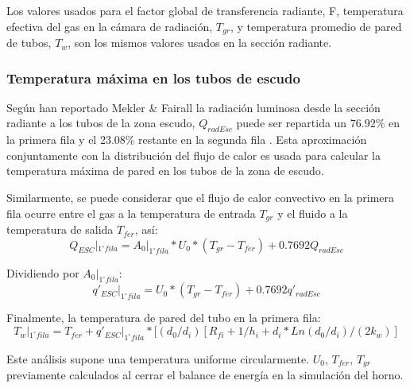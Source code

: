 \par Los valores usados para el factor global de transferencia radiante, F, temperatura efectiva del gas en la cámara de radiación, $T_{gr}$, y temperatura promedio de pared de tubos, $T_w$, son los mismos valores usados en la sección radiante.

\subsubsection{Temperatura máxima en los tubos de escudo}
\par Según han reportado Mekler \& Fairall la radiación luminosa desde la sección radiante a los tubos de la zona escudo, $Q_{radEsc}$ puede ser repartida un 76.92\% en la primera fila y el 23.08\% restante en la segunda fila \cite{bib:mekler}. Esta aproximación conjuntamente con la distribución del flujo de calor es usada para calcular la temperatura máxima de pared en los tubos de la zona de escudo.
\par Similarmente, se puede considerar que el flujo de calor convectivo en la primera fila ocurre entre el gas a la temperatura de entrada $T_{gr}$ y el fluido a la temperatura de salida $T_{fer}$, así:
\begin{equation}
Q_{ESC}|_{1^{\circ} fila} = A_0|_{1^{\circ} fila}*U_0*(T_{gr} - T_{fer}) + 0.7692 Q_{radEsc}
\end{equation}
\par Dividiendo por $A_0|_{1^{\circ} fila}$:
\begin{equation}
q\prime_{ESC}|_{1^{\circ} fila} = U_0*(T_{gr} - T_{fer}) + 0.7692 q\prime_{radEsc}
\end{equation}
\par Finalmente, la temperatura de pared del tubo en la primera fila:
\begin{equation}
T_w|_{1^{\circ} fila} = T_{fer} + q\prime_{ESC}|_{1^{\circ} fila} *[(d_0/d_i ) [R_{fi} + 1/h_i + d_i*Ln(d_0/d_i)/(2k_w)]
\end{equation}
\par Este análisis supone una temperatura uniforme circularmente. $U_0$, $T_{fer}$, $T_{gr}$ previamente calculados al cerrar el balance de energía en la simulación del horno.

